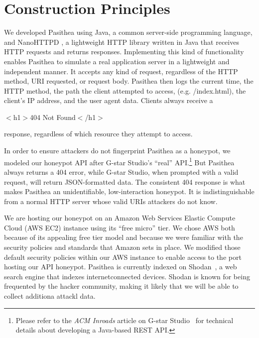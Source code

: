 
\section{Construction Principles} \label{construction}

We developed Pasithea using Java, a common server-side programming language, and NanoHTTPD \cite{Nanohttpd}, a lightweight HTTP library written in Java that receives HTTP requests and returns responses.
Implementing this kind of functionality enables Pasithea to simulate a real application server in a lightweight and independent manner. 
It accepts any kind of request, regardless of the HTTP method, URI requested, or request body. 
Pasithea then logs the current time, the HTTP method, the path the client attempted to access, (e.g. /index.html), the client's IP address, and the user agent data. 
Clients always receive a
 

\begin{center}
$<$h1$>$404 Not Found$<$/h1$>$ 
\end{center}

\noindent
response, regardless of which resource they attempt to access.

In order to ensure attackers do not fingerprint Pasithea as a honeypot, we modeled our honeypot API after G-star Studio's ``real'' API.\footnote{
Please refer to the {\em ACM Inroads} article on G-star Studio~\cite{inroads-Labouseur16} for technical details about developing a Java-based REST API.
} 
But Pasithea always returns a 404 error, while G-star Studio, when prompted with a valid request, will return JSON-formatted data. 
The consistent 404 response is what makes Pasithea an unidentifiable, low-interaction honeypot. 
It is indistinguishable from a normal HTTP server whose valid URIs attackers do not know. 

We are hosting our honeypot on an Amazon Web Services Elastic Compute Cloud (AWS EC2) instance using its ``free micro'' tier. 
We chose AWS both because of its appealing free tier model and because we were familiar with the security policies and standards that Amazon sets in place. 
We modified those default security policies within our AWS instance to enable access to the port hosting our API honeypot. 
Pasithea is currently indexed on Shodan~\cite{unsavoryChar}, a web search engine that indexes internetconnected devices.
Shodan is known for being frequented by the hacker community, making it likely that we will be able to collect additiona attackl data.
